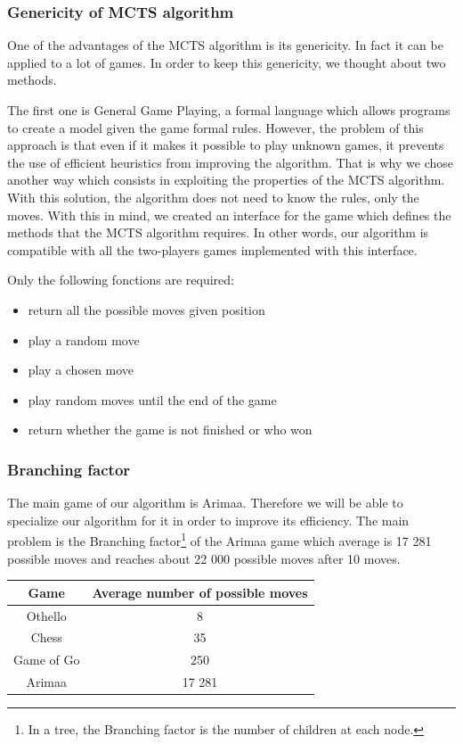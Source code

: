 \subsubsection{Genericity of MCTS algorithm}

One of the advantages of the MCTS algorithm is its genericity. In fact it can be applied to a lot of games. In order to keep this genericity, we thought about two methods.

The first one is General Game Playing\cite{General_Game_Playing}, a formal language which allows programs to create a model given the game formal rules. However, the problem of this approach is that even if it makes it possible to play unknown games, it prevents the use of efficient heuristics from improving the algorithm.
That is why we chose another way which consists in exploiting the properties of the MCTS algorithm. 
With this solution, the algorithm does not need to know the rules, only the moves. With this in mind, we created an interface for the game which defines the methods that the MCTS algorithm requires. In other words, our algorithm is compatible with all the two-players games implemented with this interface.

Only the following fonctions are required: 
\begin{itemize}[nolistsep]
\item return all the possible moves given position
\item play a random move
\item play a chosen move 
\item play random moves until the end of the game
\item return whether the game is not finished or who won
\end{itemize}

\subsubsection{Branching factor}

The main game of our algorithm is Arimaa. Therefore we will be able to specialize our algorithm for it in order to improve its efficiency. The main problem is the Branching factor\footnote{In a tree, the Branching factor is the number of children at each node.} of the Arimaa game which average is 17 281 possible moves and reaches about 22 000 possible moves after 10 moves\cite{branchin_factor}.

\begin{center}
	\begin{tabular}{ | c | c |}
		\hline Game & Average number of possible moves \\ \hline
		\hline  
		Othello & 8\\
		\hline  
		Chess & 35\\
		\hline  
		Game of Go & 250\\
		\hline
		Arimaa & 17 281\\
		\hline
	\end{tabular}
\end{center}

